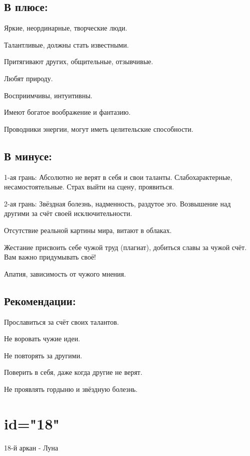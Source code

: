 \subsection{В плюсе:}
\item Яркие, неординарные, творческие люди.
\item Талантливые, должны стать известными.
\item Притягивают других, общительные, отзывчивые.
\item Любят природу.
\item Восприимчивы, интуитивны.
\item Имеют богатое воображение и фантазию.
\item Проводники энергии, могут иметь целительские способности.
\endsubsection

\subsection{В минусе:}
\item 1-ая грань: Абсолютно не верят в себя и свои таланты. Слабохарактерные, несамостоятельные. Страх выйти на сцену, проявиться.
\item 2-ая грань: Звёздная болезнь, надменность, раздутое эго. Возвышение над другими за счёт своей исключительности.
\item Отсутствие реальной картины мира, витают в облаках.
\item Жестание присвоить себе чужой труд (плагиат), добиться славы за чужой счёт. Вам важно придумывать своё!
\item Апатия, зависимость от чужого мнения.
\endsubsection

\subsection{Рекомендации:}
\item Прославиться за счёт своих талантов.
\item Не воровать чужие идеи.
\item Не повторять за другими.
\item Поверить в себя, даже когда другие не верят.
\item Не проявлять гордыню и звёздную болезнь.
\endsubsection

\endsection

\section{id="18"}{18-й аркан - Луна}

